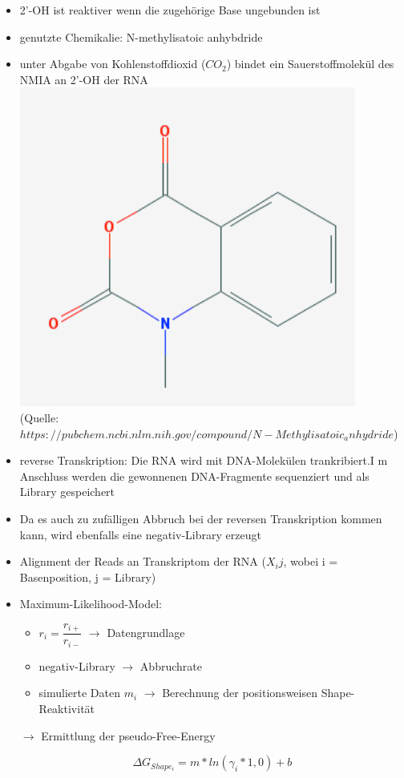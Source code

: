 \begin{itemize}
\item 2'-OH ist reaktiver wenn die zugehörige Base ungebunden ist
\item genutzte Chemikalie: N-methylisatoic anhybdride
\item unter Abgabe von Kohlenstoffdioxid ($CO_2$) bindet ein Sauerstoffmolekül des NMIA an 2'-OH der RNA \\
\includegraphics[scale=0.5]{lectures/160513/pix/NMIA.jpg} \\
(Quelle: $https://pubchem.ncbi.nlm.nih.gov/compound/N-Methylisatoic_anhydride$) \\

\item reverse Transkription: Die RNA wird mit DNA-Molekülen trankribiert.I m Anschluss werden die gewonnenen DNA-Fragmente sequenziert und als Library gespeichert
\item Da es auch zu zufälligen Abbruch bei der reversen Transkription kommen kann, wird ebenfalls eine negativ-Library erzeugt
\item Alignment der Reads an Transkriptom der RNA ($X_ij$, wobei i = Basenposition, j = Library)

\item Maximum-Likelihood-Model:

\begin{itemize}
\item $r_i = \dfrac{r_{i+}}{r_{i-}}$ $\rightarrow$ Datengrundlage
\item negativ-Library $\rightarrow$ Abbruchrate
\item simulierte Daten $m_i$ $\rightarrow$ Berechnung der positionsweisen Shape-Reaktivität 
\end{itemize}

\item[$\rightarrow$] Ermittlung der pseudo-Free-Energy

\begin{equation}
\Delta G_{Shape_i} = m * ln(\gamma_i * 1,0) + b
\end{equation}

\end{itemize}

